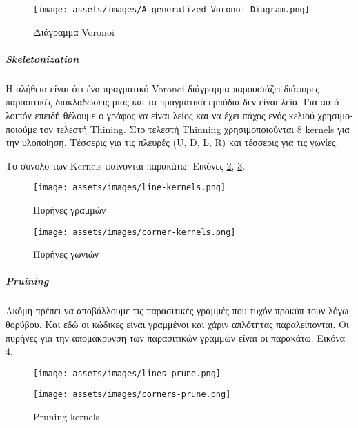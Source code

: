 \begin{figure}[!h]
	\centering
	\texttt{[image: assets/images/A-generalized-Voronoi-Diagram.png]}
 	\caption{Διάγραμμα Voronoi}
 	\label{fig:Voronoi Diagram}
\end{figure}
 
 \newpage
 
\subparagraph{Skeletonization}
 
 Η αλήθεια είναι ότι ένα πραγματικό Voronoi διάγραμμα παρουσιάζει διάφορες παρασιτικές διακλαδώσεις μιας και τα πραγματικά εμπόδια δεν είναι λεία. Για αυτό λοιπόν επειδή θέλουμε ο γράφος να είναι λείος και να έχει πάχος ενός κελιού χρησιμο-ποιούμε τον τελεστή Thining. Στο τελεστή Thinning χρησιμοποιούνται 8 kernels για την υλοποίηση. Τέσσερις για τις πλευρές\hspace{0.06 cm} (U, D, L, R) και τέσσερις για τις γωνίες.  
  
 Το σύνολο των Kernels φαίνονται παρακάτω. Εικόνες \ref{fig:line kernels}, \ref{fig:corner kernels}.
 
 \begin{figure}[!h]
 	\centering
 	\texttt{[image: assets/images/line-kernels.png]}
 	\caption{Πυρήνες γραμμών}
 	\label{fig:line kernels}
 \end{figure}

\begin{figure}[!h]
	\centering
	\texttt{[image: assets/images/corner-kernels.png]}
	\caption{Πυρήνες γωνιών}
	\label{fig:corner kernels}
\end{figure} 
 
\newpage
 
\subparagraph{Pruining}

Ακόμη πρέπει να αποβάλλουμε τις παρασιτικές γραμμές που τυχόν προκύπ-τουν λόγω θορύβου. Και εδώ οι κώδικες είναι γραμμένοι και χάριν απλότητας παραλείπονται.
Οι πυρήνες για την απομάκρυνση  των παρασιτικών γραμμών είναι οι παρακάτω.
Εικόνα \ref{fig:prune kernels}.

\begin{figure}[!h]
	\centering
	\texttt{[image: assets/images/lines-prune.png]}
\end{figure}

\begin{figure}[!h]
	\centering
	\texttt{[image: assets/images/corners-prune.png]}
	\caption{Pruning kernels}
	\label{fig:prune kernels}
\end{figure} 

